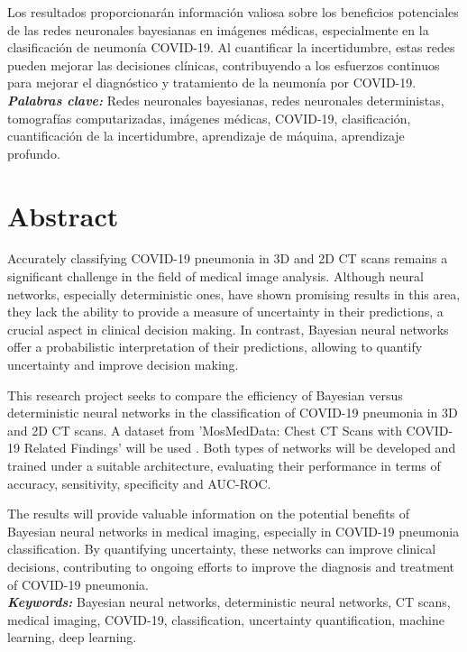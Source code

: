\documentclass[10pt, oneside, a4paper]{article}
\begin{document}
	\noindent Los resultados proporcionarán información valiosa sobre los beneficios potenciales de las redes neuronales bayesianas en imágenes médicas, especialmente en la clasificación de neumonía COVID-19. Al cuantificar la incertidumbre, estas redes pueden mejorar las decisiones clínicas, contribuyendo a los esfuerzos continuos para mejorar el diagnóstico y tratamiento de la neumonía por COVID-19. \\
	
	\textbf{\textsl{Palabras clave:}} Redes neuronales bayesianas, redes neuronales deterministas, tomografías computarizadas, imágenes médicas, COVID-19, clasificación, cuantificación de la incertidumbre, aprendizaje de máquina, aprendizaje profundo.
	

	\section*{Abstract} \label{abstract}   
	
	Accurately classifying COVID-19 pneumonia in 3D and 2D CT scans remains a significant challenge in the field of medical image analysis. Although neural networks, especially deterministic ones, have shown promising results in this area, they lack the ability to provide a measure of uncertainty in their predictions, a crucial aspect in clinical decision making. In contrast, Bayesian neural networks offer a probabilistic interpretation of their predictions, allowing to quantify uncertainty and improve decision making.
	
	\noindent This research project seeks to compare the efficiency of Bayesian versus deterministic neural networks in the classification of COVID-19 pneumonia in 3D and 2D CT scans. A dataset from 'MosMedData: Chest CT Scans with COVID-19 Related Findings' will be used \cite{mosmed}. Both types of networks will be developed and trained under a suitable architecture, evaluating their performance in terms of accuracy, sensitivity, specificity and AUC-ROC. 
	
	\noindent The results will provide valuable information on the potential benefits of Bayesian neural networks in medical imaging, especially in COVID-19 pneumonia classification. By quantifying uncertainty, these networks can improve clinical decisions, contributing to ongoing efforts to improve the diagnosis and treatment of COVID-19 pneumonia. \\
	
	\textbf{\textsl{Keywords:}} Bayesian neural networks, deterministic neural networks, CT scans, medical imaging, COVID-19, classification, uncertainty quantification, machine learning, deep learning.
\end{document}
